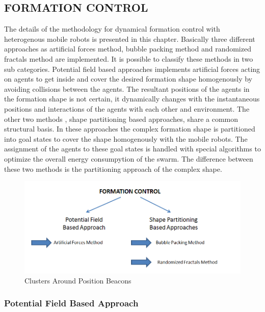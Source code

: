 \documentclass[twoside]{article}
\begin{document}
\subsection{FORMATION CONTROL}		
  The details of the methodology for dynamical formation control with heterogenous mobile robots is presented in this chapter. Basically three different approaches as artificial forces method, bubble packing method and randomized fractals method are implemented. It is possible to classify these methods in two sub categories. Potential field based approaches implements artificial forces acting on agents to get inside and cover the desired formation shape homogenously by avoiding collisions between the agents. The resultant positions of the agents in the formation shape is not certain, it dynamically changes with the instantaneous positions and interactions of the agents with each other and environment. The other two methods , shape partitioning based approaches, share a common structural basis. In these approaches the complex formation shape is partitioned into goal states to cover the shape homogenously with the mobile robots. The assignment of the agents to these goal states is handled with special algorithms to optimize the overall energy consumpytion of the swarm. The difference between these two methods is the partitioning approach of the complex shape. 
		
	\begin{figure}[H]
		\caption{Clusters Around Position Beacons}
		\centering
		\includegraphics[scale = 0.60]{methods}
	\end{figure}

		
		
		\subsubsection{Potential Field Based Approach}
\end{document}
